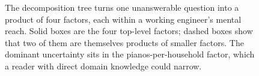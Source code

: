 \begin{figure}[ht]
\caption[Fermi decomposition tree for the Chicago piano-tuner
estimate]{The decomposition tree turns one unanswerable question
into a product of four factors, each within a working engineer's
mental reach. Solid boxes are the four top-level factors; dashed
boxes show that two of them are themselves products of smaller
factors. The dominant uncertainty sits in the pianos-per-household
factor, which a reader with direct domain knowledge could narrow.}
\label{fig:vol01:ch09:fermi-tree}
\end{figure}
